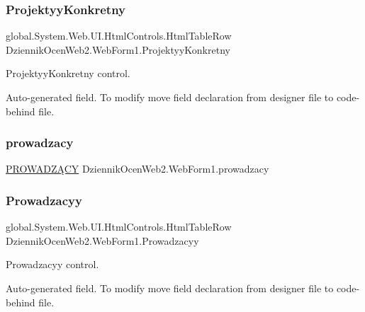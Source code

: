 \subsubsection{\texorpdfstring{Projektyy\+Konkretny}{ProjektyyKonkretny}}
{\footnotesize\ttfamily global.\+System.\+Web.\+U\+I.\+Html\+Controls.\+Html\+Table\+Row Dziennik\+Ocen\+Web2.\+Web\+Form1.\+Projektyy\+Konkretny\hspace{0.3cm}{\ttfamily [protected]}}



Projektyy\+Konkretny control. 

Auto-\/generated field. To modify move field declaration from designer file to code-\/behind file. \mbox{\label{class_dziennik_ocen_web2_1_1_web_form1_a85d951a7def4f525c11c98d11725712d}} 
\subsubsection{\texorpdfstring{prowadzacy}{prowadzacy}}
{\footnotesize\ttfamily \hyperlink{class_dziennik_ocen_web2_1_1_p_r_o_w_a_d_z_xC4_x84_c_y}{P\+R\+O\+W\+A\+D\+ZĄ\+CY} Dziennik\+Ocen\+Web2.\+Web\+Form1.\+prowadzacy\hspace{0.3cm}{\ttfamily [private]}}

\mbox{\label{class_dziennik_ocen_web2_1_1_web_form1_a09925c3ffc18a518cf5b176db72f0d6a}} 
\subsubsection{\texorpdfstring{Prowadzacyy}{Prowadzacyy}}
{\footnotesize\ttfamily global.\+System.\+Web.\+U\+I.\+Html\+Controls.\+Html\+Table\+Row Dziennik\+Ocen\+Web2.\+Web\+Form1.\+Prowadzacyy\hspace{0.3cm}{\ttfamily [protected]}}



Prowadzacyy control. 

Auto-\/generated field. To modify move field declaration from designer file to code-\/behind file. \mbox{\label{class_dziennik_ocen_web2_1_1_web_form1_a5706de5be7075aed0566131920df6527}} 
